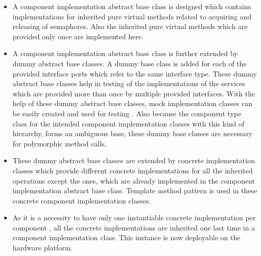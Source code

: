 \begin{itemize}
\item A component implementation abstract base class is designed which contains implementations for inherited pure virtual methods related to acquiring and releasing of semaphores. Also the inherited pure virtual methods which are provided only once are implemented here.
\item A component implementation abstract base class is further extended by dummy abstract base classes. A dummy base class is added for each of the provided interface ports which refer to the same interface type. These dummy abstract base classes help in testing of the implementations of the services which are provided more than once by multiple provided interfaces. With the help of these dummy abstract base classes, mock implementation classes can be easily created and used for testing \cite{InvOfCntrlurl}. Also because the component type class for the intended component implementation classes with this kind of hierarchy, forms an ambiguous base, these dummy base classes are necessary for polymorphic method calls.  
\item These dummy abstract base classes are extended by concrete implementation classes which provide different concrete implementations for all the inherited operations except the ones, which are already implemented in the component implementation abstract base class. Template method pattern \cite{TemplatePattern} is used in these concrete component implementation classes.
\item As it is a necessity to have only one instantiable concrete implementation per component \cite{EvoRAVCodeAr}\cite{SpecMetamodel}\cite{CompBasedProcess}, all the concrete implementations are inherited one last time in a component implementation class. This instance is now deployable on the hardware platform.
\end{itemize}
 
